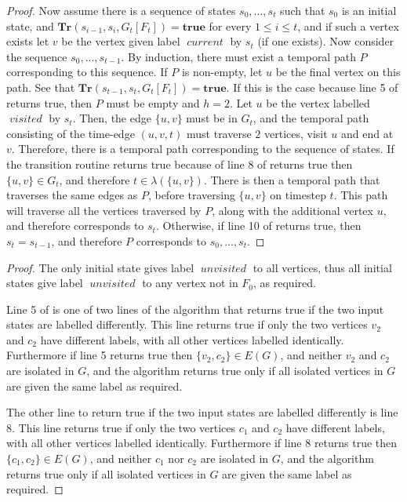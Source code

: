 \documentclass[a4paper,UKenglish,cleveref, autoref, thm-restate]{lipics-v2021} %
\DeclareMathOperator{\visited}{\textit{visited}}
\DeclareMathOperator{\unvisited}{\textit{unvisited}}
\DeclareMathOperator{\current}{\textit{current}}
\begin{document}
\begin{toappendix}
\begin{proof}
    Now assume there is a sequence of states $s_0, \ldots, s_t$ such that $s_0$ is an initial state, and $\textbf{Tr}(s_{i-1}, s_i, G_t[F_t])=\textbf{true}$ for every $1 \leq i \leq t$, and if such a vertex exists let $v$ be the vertex given label $\current$ by $s_t$ (if one exists). Now consider the sequence $s_0, ..., s_{t-1}$. By induction, there must exist a temporal path $P$ corresponding to this sequence. If $P$ is non-empty, let $u$ be the final vertex on this path. See that $\textbf{Tr}(s_{t-1}, s_t, G_t[F_t])=\textbf{true}$. If this is the case because line 5 of  returns true, then $P$ must be empty and $h=2$. Let $u$ be the vertex labelled $\visited$ by $s_t$. Then, the edge $\{u,v\}$ must be in $G_t$, and the temporal path consisting of the time-edge $(u,v,t)$ must traverse $2$ vertices, visit $u$ and end at $v$. Therefore, there is a temporal path corresponding to the sequence of states.
    If the transition routine returns true because  of line 8 of  returns true then $\{u,v\} \in G_t$, and therefore $t \in \lambda(\{u,v\})$. There is then a temporal path that traverses the same edges as $P$, before traversing $\{u,v\}$ on timestep $t$. This path will traverse all the vertices traversed by $P$, along with the additional vertex $u$, and therefore corresponds to $s_t$.
    Otherwise, if line 10 of  returns true, then $s_t = s_{t-1}$, and therefore $P$ corresponds to $s_0, ..., s_t$.
\end{proof}
\vimhamiltonthm*

\begin{proof}
    The only initial state gives label $\unvisited$ to all vertices, thus all initial states give label $\unvisited$ to any vertex not in $F_0$, as required. 

    Line 5 of  is one of two lines of the algorithm that returns true if the two input states are labelled differently. This line returns true if only the two vertices $v_2$ and $c_2$ have different labels, with all other vertices labelled identically. Furthermore if line 5 returns true then $\{v_2, c_2\} \in E(G)$, and neither $v_2$ and $c_2$ are isolated in $G$, and the algorithm returns true only if all isolated vertices in $G$ are given the same label as required.
    
    The other line to return true if the two input states are labelled differently is line 8. This line returns true if only the two vertices $c_1$ and $c_2$ have different labels, with all other vertices labelled identically. Furthermore if line 8 returns true then $\{c_1, c_2\} \in E(G)$, and neither $c_1$ nor $c_2$ are isolated in $G$, and the algorithm returns true only if all isolated vertices in $G$ are given the same label as required.


\end{proof}
\end{toappendix}
\end{document}

